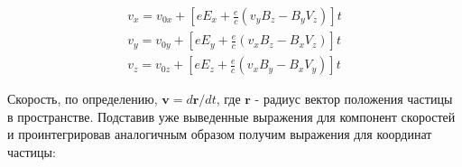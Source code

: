 \documentclass[a4paper]{article}
\begin{document}
\begin{equation}\label{velocity_components}
\begin{aligned}
v_x = v_{0x} + \left[ e E_x + \frac{e}{c} \left( v_y B_z - B_y V_z \right) \right] t \\
v_y = v_{0y} + \left[ e E_y + \frac{e}{c} \left( v_x B_z - B_x V_z \right) \right] t \\
v_z = v_{0z} + \left[ e E_z + \frac{e}{c} \left( v_x B_y - B_x V_y \right) \right] t
\end{aligned}
\end{equation}

Скорость, по определению, $\mathbf{v} = d\mathbf{r}/dt$, где $\mathbf{r}$ - радиус вектор положения частицы в пространстве. Подставив уже выведенные выражения для компонент скоростей и проинтегрировав аналогичным образом получим выражения для координат частицы:
\end{document}
